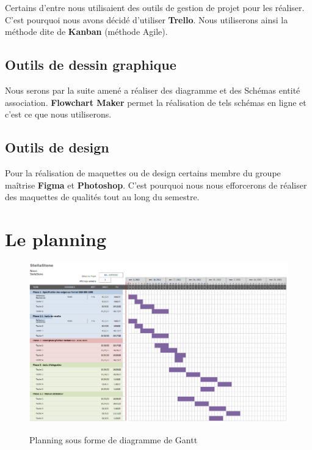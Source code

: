 \documentclass[a4paper, 12pt]{article}
\begin{document}
Certains d'entre nous utilisaient des outils de gestion de projet pour les réaliser. C'est pourquoi nous avons décidé d'utiliser \textbf{Trello}. Nous utiliserons ainsi la méthode dite de \textbf{Kanban} (méthode Agile).
\newpage

\subsection{Outils de dessin graphique}

Nous serons par la suite amené a réaliser des diagramme et des Schémas entité association. \textbf{Flowchart Maker} permet la réalisation de tels schémas en ligne et c'est ce que nous utiliserons.

\subsection{Outils de design}
Pour la réalisation de maquettes ou de design certains membre du groupe maîtrise \textbf{Figma} et \textbf{Photoshop}. C'est pourquoi nous nous efforcerons de réaliser des maquettes de qualités tout au long du semestre.\\


\section{Le planning}

 \begin{figure}[!h]
    \centering
    \includegraphics[scale=0.5]{Le_planning.png}
    \label{fig:Le_planning}
    \caption{Planning sous forme de diagramme de Gantt}
\end{figure}


\newpage
\end{document}

